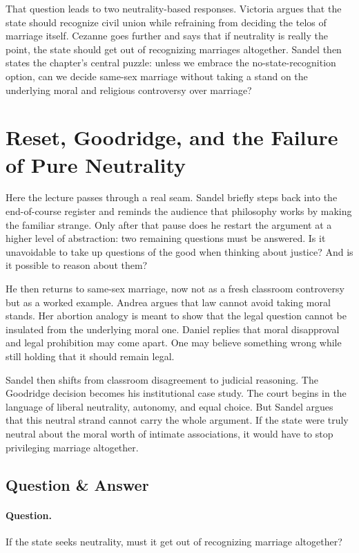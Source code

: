 That question leads to two neutrality-based responses. Victoria argues that the state should recognize civil union while refraining from deciding the telos of marriage itself. Cezanne goes further and says that if neutrality is really the point, the state should get out of recognizing marriages altogether. Sandel then states the chapter's central puzzle: unless we embrace the no-state-recognition option, can we decide same-sex marriage without taking a stand on the underlying moral and religious controversy over marriage?

\section{Reset, Goodridge, and the Failure of Pure Neutrality}

Here the lecture passes through a real seam. Sandel briefly steps back into the end-of-course register and reminds the audience that philosophy works by making the familiar strange. Only after that pause does he restart the argument at a higher level of abstraction: two remaining questions must be answered. Is it unavoidable to take up questions of the good when thinking about justice? And is it possible to reason about them?

He then returns to same-sex marriage, now not as a fresh classroom controversy but as a worked example. Andrea argues that law cannot avoid taking moral stands. Her abortion analogy is meant to show that the legal question cannot be insulated from the underlying moral one. Daniel replies that moral disapproval and legal prohibition may come apart. One may believe something wrong while still holding that it should remain legal.

Sandel then shifts from classroom disagreement to judicial reasoning. The Goodridge decision becomes his institutional case study. The court begins in the language of liberal neutrality, autonomy, and equal choice. But Sandel argues that this neutral strand cannot carry the whole argument. If the state were truly neutral about the moral worth of intimate associations, it would have to stop privileging marriage altogether.

\subsection{Question \& Answer}

\paragraph{Question.} If the state seeks neutrality, must it get out of recognizing marriage altogether?

